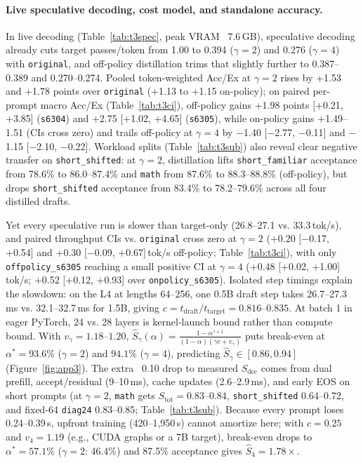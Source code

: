 \documentclass{article}
\begin{document}
\paragraph{Live speculative decoding, cost model, and standalone accuracy.}
In live decoding (Table~\ref{tab:t3spec}, peak VRAM ~7.6\,GB), speculative decoding already cuts target passes/token from 1.00 to 0.394 ($\gamma=2$) and 0.276 ($\gamma=4$) with \texttt{original}, and off-policy distillation trims that slightly further to 0.387--0.389 and 0.270--0.274. Pooled token-weighted Acc/Ex at $\gamma=2$ rises by +1.53 and +1.78 points over \texttt{original} (+1.13 to +1.15 on-policy); on paired per-prompt macro Acc/Ex (Table~\ref{tab:t3ci}), off-policy gains +1.98 points [+0.21, +3.85] (\texttt{s6304}) and +2.75 [+1.02, +4.65] (\texttt{s6305}), while on-policy gains +1.49--1.51 (CIs cross zero) and trails off-policy at $\gamma=4$ by $-$1.40 [$-$2.77, $-$0.11] and $-$1.15 [$-$2.10, $-$0.22]. Workload splits (Table~\ref{tab:t3sub}) also reveal clear negative transfer on \texttt{short\_shifted}: at $\gamma=2$, distillation lifts \texttt{short\_familiar} acceptance from 78.6\% to 86.0--87.4\% and \texttt{math} from 87.6\% to 88.3--88.8\% (off-policy), but drops \texttt{short\_shifted} acceptance from 83.4\% to 78.2--79.6\% across all four distilled drafts.

Yet every speculative run is slower than target-only (26.8--27.1 vs. 33.3\,tok/s), and paired throughput CIs vs. \texttt{original} cross zero at $\gamma=2$ (+0.20 [$-$0.17, +0.54] and +0.30 [$-$0.09, +0.67]\,tok/s off-policy; Table~\ref{tab:t3ci}), with only \texttt{offpolicy\_s6305} reaching a small positive CI at $\gamma=4$ (+0.48 [+0.02, +1.00]\,tok/s; +0.52 [+0.12, +0.93] over \texttt{onpolicy\_s6305}). Isolated step timings explain the slowdown: on the L4 at lengths 64--256, one 0.5B draft step takes 26.7--27.3\,ms vs. 32.1--32.7\,ms for 1.5B, giving $c=t_{\text{draft}}/t_{\text{target}}=0.816$--$0.835$. At batch 1 in eager PyTorch, 24 vs. 28 layers is kernel-launch bound rather than compute bound. With $v_\gamma=1.18$--$1.20$, $\hat{S}_\gamma(\alpha)=\frac{1-\alpha^{\gamma+1}}{(1-\alpha)(\gamma c+v_\gamma)}$ puts break-even at $\alpha^*=93.6\%$ ($\gamma=2$) and $94.1\%$ ($\gamma=4$), predicting $\hat{S}_\gamma\in[0.86, 0.94]$ (Figure~\ref{fig:app3}). The extra ~0.10 drop to measured $S_{\text{dec}}$ comes from dual prefill, accept/residual (9--10\,ms), cache updates (2.6--2.9\,ms), and early EOS on short prompts (at $\gamma=2$, \texttt{math} gets $S_{\text{tot}}=0.83$--$0.84$, \texttt{short\_shifted} 0.64--0.72, and fixed-64 \texttt{diag24} 0.83--0.85; Table~\ref{tab:t3sub}). Because every prompt loses 0.24--0.39\,s, upfront training (420--1,950\,s) cannot amortize here; with $c=0.25$ and $v_4=1.19$ (e.g., CUDA graphs or a 7B target), break-even drops to $\alpha^*=57.1\%$ ($\gamma=2$: 46.4\%) and 87.5\% acceptance gives $\hat{S}_4=1.78\times$.
\end{document}
